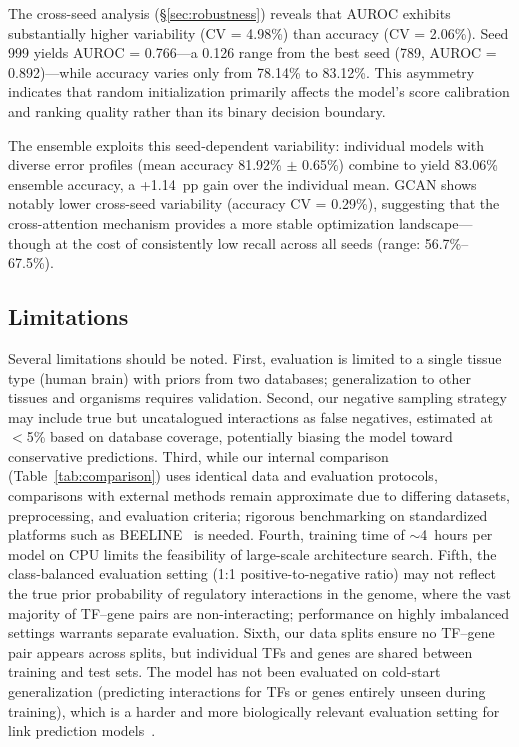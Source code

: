 \documentclass[10pt,twocolumn]{article}
\begin{document}
The cross-seed analysis (\S\ref{sec:robustness}) reveals that AUROC exhibits substantially higher variability (CV = 4.98\%) than accuracy (CV = 2.06\%).
Seed 999 yields AUROC = 0.766---a 0.126 range from the best seed (789, AUROC = 0.892)---while accuracy varies only from 78.14\% to 83.12\%.
This asymmetry indicates that random initialization primarily affects the model's score calibration and ranking quality rather than its binary decision boundary.

The ensemble exploits this seed-dependent variability: individual models with diverse error profiles (mean accuracy 81.92\% $\pm$ 0.65\%) combine to yield 83.06\% ensemble accuracy, a +1.14~pp gain over the individual mean.
GCAN shows notably lower cross-seed variability (accuracy CV = 0.29\%), suggesting that the cross-attention mechanism provides a more stable optimization landscape---though at the cost of consistently low recall across all seeds (range: 56.7\%--67.5\%).

\subsection{Limitations}
\label{sec:limitations}

Several limitations should be noted.
First, evaluation is limited to a single tissue type (human brain) with priors from two databases; generalization to other tissues and organisms requires validation.
Second, our negative sampling strategy may include true but uncatalogued interactions as false negatives, estimated at $<$5\% based on database coverage, potentially biasing the model toward conservative predictions.
Third, while our internal comparison (Table~\ref{tab:comparison}) uses identical data and evaluation protocols, comparisons with external methods remain approximate due to differing datasets, preprocessing, and evaluation criteria; rigorous benchmarking on standardized platforms such as BEELINE~\cite{pratapa2020benchmarking} is needed.
Fourth, training time of ${\sim}$4~hours per model on CPU limits the feasibility of large-scale architecture search.
Fifth, the class-balanced evaluation setting (1:1 positive-to-negative ratio) may not reflect the true prior probability of regulatory interactions in the genome, where the vast majority of TF--gene pairs are non-interacting; performance on highly imbalanced settings warrants separate evaluation.
Sixth, our data splits ensure no TF--gene pair appears across splits, but individual TFs and genes are shared between training and test sets.
The model has not been evaluated on cold-start generalization (predicting interactions for TFs or genes entirely unseen during training), which is a harder and more biologically relevant evaluation setting for link prediction models~\cite{bonner2022review}.
\end{document}
